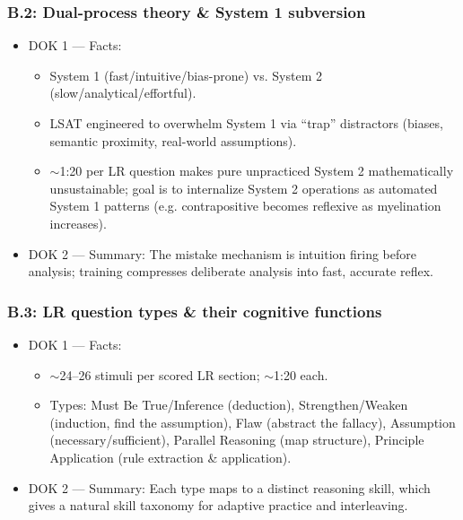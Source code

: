 \documentclass[11pt]{article}
\begin{document}
\subsubsection*{B.2: Dual-process theory \& System 1 subversion}
\begin{itemize}
\item DOK 1 --- Facts:
\begin{itemize}
\item System 1 (fast/intuitive/bias-prone) vs. System 2 (slow/analytical/effortful).
\item LSAT engineered to overwhelm System 1 via \enquote{trap} distractors (biases, semantic proximity, real-world assumptions).
\item $\sim$1:20 per LR question makes pure unpracticed System 2 mathematically unsustainable; goal is to internalize System 2 operations as automated System 1 patterns (e.g. contrapositive becomes reflexive as myelination increases).
\end{itemize}
\item DOK 2 --- Summary: The mistake mechanism is intuition firing before analysis; training compresses deliberate analysis into fast, accurate reflex.
\end{itemize}
\subsubsection*{B.3: LR question types \& their cognitive functions}
\begin{itemize}
\item DOK 1 --- Facts:
\begin{itemize}
\item $\sim$24--26 stimuli per scored LR section; $\sim$1:20 each.
\item Types: Must Be True/Inference (deduction), Strengthen/Weaken (induction, find the assumption), Flaw (abstract the fallacy), Assumption (necessary/sufficient), Parallel Reasoning (map structure), Principle Application (rule extraction \& application).
\end{itemize}
\item DOK 2 --- Summary: Each type maps to a distinct reasoning skill, which gives a natural skill taxonomy for adaptive practice and interleaving.
\end{itemize}
\end{document}
